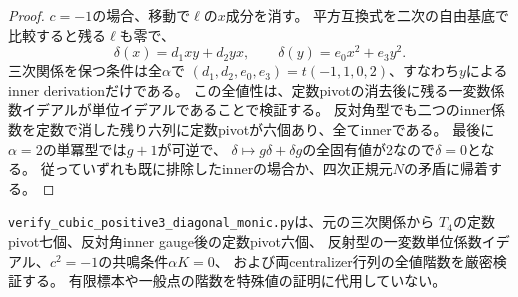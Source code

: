 \begin{proof}
$c=-1$の場合、移動で$\ell$の$x$成分を消す。
平方互換式を二次の自由基底で比較すると残る$\ell$も零で、
\[
 \delta(x)=d_1xy+d_2yx,\qquad \delta(y)=e_0x^2+e_3y^2.
\]
三次関係を保つ条件は全$\alpha$で
$(d_1,d_2,e_0,e_3)=t(-1,1,0,2)$、すなわち$y$によるinner derivationだけである。
この全値性は、定数pivotの消去後に残る一変数係数イデアルが単位イデアルであることで検証する。
反対角型でも二つのinner係数を定数で消した残り六列に定数pivotが六個あり、全てinnerである。
最後に$\alpha=2$の単冪型では$g+1$が可逆で、
$\delta\mapsto g\delta+\delta g$の全固有値が2なので$\delta=0$となる。
従っていずれも既に排除したinnerの場合か、四次正規元$N$の矛盾に帰着する。
\end{proof}

\texttt{verify\_cubic\_positive3\_diagonal\_monic.py}は、元の三次関係から
$T_4$の定数pivot七個、反対角inner gauge後の定数pivot六個、
反射型の一変数単位係数イデアル、$c^2=-1$の共鳴条件$\alpha K=0$、
および両centralizer行列の全値階数を厳密検証する。
有限標本や一般点の階数を特殊値の証明に代用していない。
